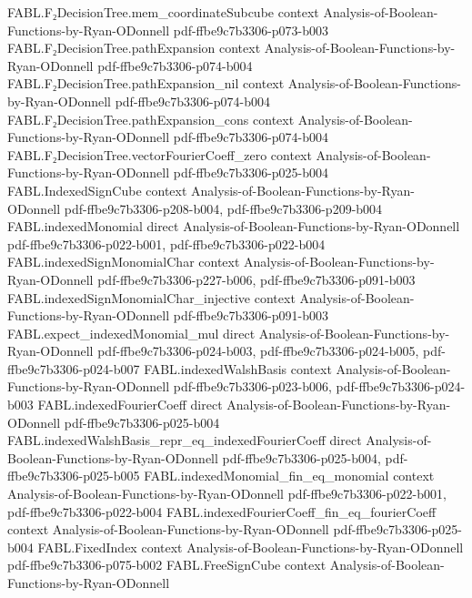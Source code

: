 \begin{theorem}
  {FABL.F₂DecisionTree.mem_coordinateSubcube}
  {context}
  {Analysis-of-Boolean-Functions-by-Ryan-ODonnell}
  {pdf-ffbe9c7b3306-p073-b003}
\proofstep
  {FABL.F₂DecisionTree.pathExpansion}
  {context}
  {Analysis-of-Boolean-Functions-by-Ryan-ODonnell}
  {pdf-ffbe9c7b3306-p074-b004}
\proofstep
  {FABL.F₂DecisionTree.pathExpansion_nil}
  {context}
  {Analysis-of-Boolean-Functions-by-Ryan-ODonnell}
  {pdf-ffbe9c7b3306-p074-b004}
\proofstep
  {FABL.F₂DecisionTree.pathExpansion_cons}
  {context}
  {Analysis-of-Boolean-Functions-by-Ryan-ODonnell}
  {pdf-ffbe9c7b3306-p074-b004}
\proofstep
  {FABL.F₂DecisionTree.vectorFourierCoeff_zero}
  {context}
  {Analysis-of-Boolean-Functions-by-Ryan-ODonnell}
  {pdf-ffbe9c7b3306-p025-b004}
\proofstep
  {FABL.IndexedSignCube}
  {context}
  {Analysis-of-Boolean-Functions-by-Ryan-ODonnell}
  {pdf-ffbe9c7b3306-p208-b004,
    pdf-ffbe9c7b3306-p209-b004}
\proofstep
  {FABL.indexedMonomial}
  {direct}
  {Analysis-of-Boolean-Functions-by-Ryan-ODonnell}
  {pdf-ffbe9c7b3306-p022-b001,
    pdf-ffbe9c7b3306-p022-b004}
\proofstep
  {FABL.indexedSignMonomialChar}
  {context}
  {Analysis-of-Boolean-Functions-by-Ryan-ODonnell}
  {pdf-ffbe9c7b3306-p227-b006,
    pdf-ffbe9c7b3306-p091-b003}
\proofstep
  {FABL.indexedSignMonomialChar_injective}
  {context}
  {Analysis-of-Boolean-Functions-by-Ryan-ODonnell}
  {pdf-ffbe9c7b3306-p091-b003}
\proofstep
  {FABL.expect_indexedMonomial_mul}
  {direct}
  {Analysis-of-Boolean-Functions-by-Ryan-ODonnell}
  {pdf-ffbe9c7b3306-p024-b003,
    pdf-ffbe9c7b3306-p024-b005,
    pdf-ffbe9c7b3306-p024-b007}
\proofstep
  {FABL.indexedWalshBasis}
  {context}
  {Analysis-of-Boolean-Functions-by-Ryan-ODonnell}
  {pdf-ffbe9c7b3306-p023-b006,
    pdf-ffbe9c7b3306-p024-b003}
\proofstep
  {FABL.indexedFourierCoeff}
  {direct}
  {Analysis-of-Boolean-Functions-by-Ryan-ODonnell}
  {pdf-ffbe9c7b3306-p025-b004}
\proofstep
  {FABL.indexedWalshBasis_repr_eq_indexedFourierCoeff}
  {direct}
  {Analysis-of-Boolean-Functions-by-Ryan-ODonnell}
  {pdf-ffbe9c7b3306-p025-b004,
    pdf-ffbe9c7b3306-p025-b005}
\proofstep
  {FABL.indexedMonomial_fin_eq_monomial}
  {context}
  {Analysis-of-Boolean-Functions-by-Ryan-ODonnell}
  {pdf-ffbe9c7b3306-p022-b001,
    pdf-ffbe9c7b3306-p022-b004}
\proofstep
  {FABL.indexedFourierCoeff_fin_eq_fourierCoeff}
  {context}
  {Analysis-of-Boolean-Functions-by-Ryan-ODonnell}
  {pdf-ffbe9c7b3306-p025-b004}
\proofstep
  {FABL.FixedIndex}
  {context}
  {Analysis-of-Boolean-Functions-by-Ryan-ODonnell}
  {pdf-ffbe9c7b3306-p075-b002}
\proofstep
  {FABL.FreeSignCube}
  {context}
  {Analysis-of-Boolean-Functions-by-Ryan-ODonnell}

\end{theorem}
